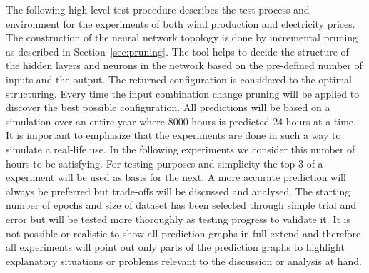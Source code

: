 The following high level test procedure describes the test process and environment for the experiments of both wind production and electricity prices. 
\\[0.5cm]
The construction of the neural network topology is done by incremental pruning as described in Section~\ref{sec:pruning}. The tool helps to decide the structure of the hidden layers and neurons in the network based on the pre-defined number of inputs and the output. The returned configuration is considered to the optimal structuring. Every time the input combination change pruning will be applied to discover the best possible configuration. All predictions will be based on a simulation over an entire year where 8000 hours is predicted 24 hours at a time. It is important to emphasize that the experiments are done in such a way to simulate a real-life use. In the following experiments we consider this number of hours to be satisfying.  For testing purposes and simplicity the top-3 of a experiment will be used as basis for the next. A more accurate prediction will always be preferred but trade-offs will be discussed and analysed. The starting number of epochs and size of dataset has been selected through simple trial and error but will be tested more thoroughly as testing progress to validate it. It is not possible or realistic to show all prediction graphs in full extend and therefore all experiments will point out only parts of the prediction graphs to highlight explanatory situations or problems relevant to the discussion or analysis at hand.     


